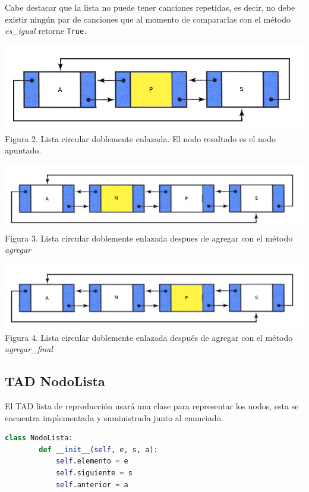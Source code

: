 \documentclass[10pt, letterpaper]{article}
\begin{document}
Cabe destacar que la lista no puede tener canciones repetidas, es decir, no debe existir ningún par de canciones que al momento de compararlas con el método \textit{es\_igual} retorne \texttt{True}.

\begin{center}
\includegraphics[width=0.5\linewidth]{dlist1.jpg}\\
Figura 2. Lista circular doblemente enlazada. El nodo resaltado es el nodo apuntado.
\end{center}

\begin{center}
\includegraphics[width=0.6\linewidth]{dlist2.jpg}\\
Figura 3. Lista circular doblemente enlazada despues de agregar con el método \textit{agregar}
\end{center}

\begin{center}
\includegraphics[width=0.6\linewidth]{dlist3.jpg}\\
Figura 4. Lista circular doblemente enlazada después de agregar con el método \textit{agregar\_final}
\end{center}

\subsection*{TAD NodoLista}
El TAD lista de reproducción usará una clase para representar los nodos, esta se encuentra implementada y suministrada junto al enunciado.

\begin{center}
\begin{lstlisting}[language=Python,frame=single]
    class NodoLista:
        def __init__(self, e, s, a):
            self.elemento = e
            self.siguiente = s
            self.anterior = a  
\end{lstlisting}
\end{center}
\end{document}
